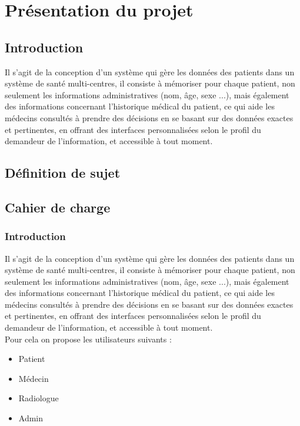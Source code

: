 \chapter{Présentation du projet}

\section{Introduction}

Il s’agit de la conception d’un système qui gère les données des patients dans un système de santé multi-centres, il consiste à mémoriser pour chaque patient, non seulement les informations administratives (nom, âge, sexe ...), mais également des informations concernant l’historique médical du patient, ce qui aide les médecins consultés à prendre des décisions en se basant sur des données exactes et pertinentes, en offrant des interfaces personnalisées selon le profil du demandeur de l’information, et accessible à tout moment. 


\section{Définition de sujet}



\section{Cahier de charge}

\subsection{Introduction}

Il s’agit de la conception d’un système qui gère les données des patients dans un système de santé multi-centres, il consiste à mémoriser pour chaque patient, non seulement les informations administratives (nom, âge, sexe ...), mais également des informations concernant l’historique médical du patient, ce qui aide les médecins consultés à prendre des décisions en se basant sur des données exactes et pertinentes, en offrant des interfaces personnalisées selon le profil du demandeur de l’information, et accessible à tout moment.\\
Pour cela on propose les utilisateurs suivants : 

\begin{itemize}
\item Patient
\item Médecin
\item Radiologue
\item Admin
\end{itemize}
 

